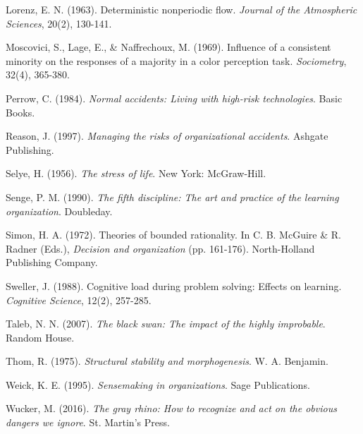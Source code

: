\documentclass[11pt,a4paper]{article}
\begin{document}
\begin{thebibliography}{99}
Lorenz, E. N. (1963). Deterministic nonperiodic flow. \textit{Journal of the Atmospheric Sciences}, 20(2), 130-141.

Moscovici, S., Lage, E., \& Naffrechoux, M. (1969). Influence of a consistent minority on the responses of a majority in a color perception task. \textit{Sociometry}, 32(4), 365-380.

Perrow, C. (1984). \textit{Normal accidents: Living with high-risk technologies}. Basic Books.

Reason, J. (1997). \textit{Managing the risks of organizational accidents}. Ashgate Publishing.

Selye, H. (1956). \textit{The stress of life}. New York: McGraw-Hill.

Senge, P. M. (1990). \textit{The fifth discipline: The art and practice of the learning organization}. Doubleday.

Simon, H. A. (1972). Theories of bounded rationality. In C. B. McGuire \& R. Radner (Eds.), \textit{Decision and organization} (pp. 161-176). North-Holland Publishing Company.

Sweller, J. (1988). Cognitive load during problem solving: Effects on learning. \textit{Cognitive Science}, 12(2), 257-285.

Taleb, N. N. (2007). \textit{The black swan: The impact of the highly improbable}. Random House.

Thom, R. (1975). \textit{Structural stability and morphogenesis}. W. A. Benjamin.

Weick, K. E. (1995). \textit{Sensemaking in organizations}. Sage Publications.

Wucker, M. (2016). \textit{The gray rhino: How to recognize and act on the obvious dangers we ignore}. St. Martin's Press.

\end{thebibliography}
\end{document}
